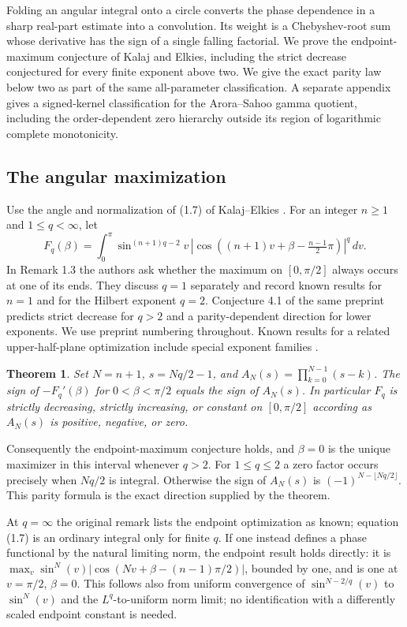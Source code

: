\documentclass[11pt,a4paper]{article}
\numberwithin{equation}{section}
\newtheorem{theorem}{Theorem}[section]
\theoremstyle{definition}
\theoremstyle{remark}
\newenvironment{sectionabstract}{\par\smallskip\begingroup\small\noindent}{\par\endgroup\medskip}
\begin{document}
\begin{sectionabstract}
Folding an angular integral onto a circle converts the phase dependence in a sharp real-part estimate into a convolution. Its weight is a Chebyshev-root sum whose derivative has the sign of a single falling factorial. We prove the endpoint-maximum conjecture of Kalaj and Elkies, including the strict decrease conjectured for every finite exponent above two. We give the exact parity law below two as part of the same all-parameter classification. A separate appendix gives a signed-kernel classification for the Arora--Sahoo gamma quotient, including the order-dependent zero hierarchy outside its region of logarithmic complete monotonicity.
\end{sectionabstract}
\subsection{The angular maximization}
Use the angle and normalization of (1.7) of Kalaj--Elkies \cite{r31heisei:EK}. For an integer $n\ge1$ and $1\le q<\infty$, let
\[
 F_q(\beta)=\int_0^\pi \sin^{(n+1)q-2}v\,
 \left|\cos\!\left((n+1)v+\beta-\tfrac{n-1}{2}\pi\right)\right|^q\,dv.
\]
In Remark 1.3 the authors ask whether the maximum on $[0,\pi/2]$ always occurs at one of its ends. They discuss $q=1$ separately and record known results for $n=1$ and for the Hilbert exponent $q=2$. Conjecture 4.1 of the same preprint predicts strict decrease for $q>2$ and a parity-dependent direction for lower exponents. We use preprint numbering throughout. Known results for a related upper-half-plane optimization include special exponent families \cite{r31heisei:K}.
\begin{theorem}\label{r31heisei:main}
Set $N=n+1$, $s=Nq/2-1$, and $A_N(s)=\prod_{k=0}^{N-1}(s-k)$. The sign of $-F_q'(\beta)$ for $0<\beta<\pi/2$ equals the sign of $A_N(s)$. In particular $F_q$ is strictly decreasing, strictly increasing, or constant on $[0,\pi/2]$ according as $A_N(s)$ is positive, negative, or zero.
\end{theorem}
Consequently the endpoint-maximum conjecture holds, and $\beta=0$ is the unique maximizer in this interval whenever $q>2$. For $1\le q\le2$ a zero factor occurs precisely when $Nq/2$ is integral. Otherwise the sign of $A_N(s)$ is $(-1)^{N-\lfloor Nq/2\rfloor}$. This parity formula is the exact direction supplied by the theorem.


At $q=\infty$ the original remark lists the endpoint optimization as known; equation (1.7) is an ordinary integral only for finite $q$. If one instead defines a phase functional by the natural limiting norm, the endpoint result holds directly: it is
$\max_v \sin^N(v) |\cos(Nv+\beta-(n-1)\pi/2)|$, bounded by one, and is one at $v=\pi/2$, $\beta=0$. This follows also from uniform convergence of $\sin^{N-2/q}(v)$ to $\sin^N(v)$ and the $L^q$-to-uniform norm limit; no identification with a differently scaled endpoint constant is needed.
\end{document}
